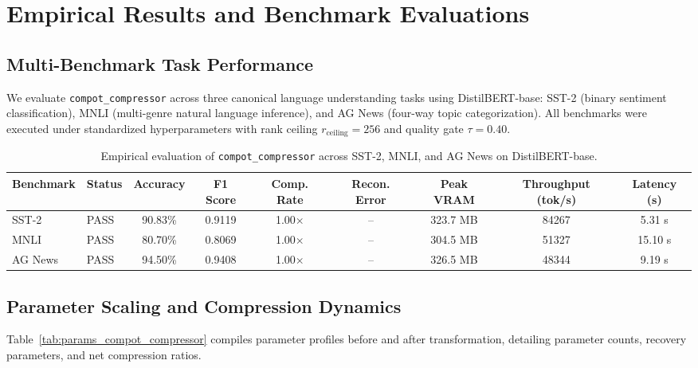 \section{Empirical Results and Benchmark Evaluations}
\label{sec:results}

\subsection{Multi-Benchmark Task Performance}
We evaluate \texttt{compot\_compressor} across three canonical language understanding tasks using DistilBERT-base: SST-2 (binary sentiment classification), MNLI (multi-genre natural language inference), and AG News (four-way topic categorization). All benchmarks were executed under standardized hyperparameters with rank ceiling $r_{\mathrm{ceiling}} = 256$ and quality gate $\tau = 0.40$.

\begin{table}[t]
\centering
\small
\begin{tabular}{llccccccc}
\toprule
\textbf{Benchmark} & \textbf{Status} & \textbf{Accuracy} & \textbf{F1 Score} & \textbf{Comp. Rate} & \textbf{Recon. Error} & \textbf{Peak VRAM} & \textbf{Throughput (tok/s)} & \textbf{Latency (s)} \\
\midrule
SST-2 & PASS & 90.83\% & 0.9119 & 1.00$\times$ & -- & 323.7 MB & 84267 & 5.31 s \\
MNLI & PASS & 80.70\% & 0.8069 & 1.00$\times$ & -- & 304.5 MB & 51327 & 15.10 s \\
AG News & PASS & 94.50\% & 0.9408 & 1.00$\times$ & -- & 326.5 MB & 48344 & 9.19 s \\
\bottomrule
\end{tabular}
\caption{Empirical evaluation of \texttt{compot\_compressor} across SST-2, MNLI, and AG News on DistilBERT-base.}
\label{tab:results_compot_compressor}
\end{table}

\subsection{Parameter Scaling and Compression Dynamics}
Table~\ref{tab:params_compot_compressor} compiles parameter profiles before and after transformation, detailing parameter counts, recovery parameters, and net compression ratios.

